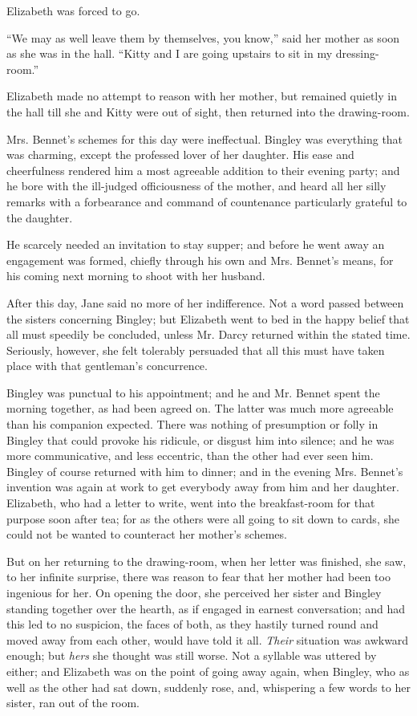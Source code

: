 \documentclass[12pt,openright]{book}
\begin{document}
Elizabeth was forced to go.

“We may as well leave them by themselves, you know,” said her mother as soon as she was in the hall. “Kitty and I are going upstairs to sit in my dressing-room.”

Elizabeth made no attempt to reason with her mother, but remained quietly in the hall till she and Kitty were out of sight, then returned into the drawing-room.

Mrs. Bennet’s schemes for this day were ineffectual. Bingley was everything that was charming, except the professed lover of her daughter. His ease and cheerfulness rendered him a most agreeable addition to their evening party; and he bore with the ill-judged officiousness of the mother, and heard all her silly remarks with a forbearance and command of countenance particularly grateful to the daughter.

He scarcely needed an invitation to stay supper; and before he went away an engagement was formed, chiefly through his own and Mrs. Bennet’s means, for his coming next morning to shoot with her husband.

After this day, Jane said no more of her indifference. Not a word passed between the sisters concerning Bingley; but Elizabeth went to bed in the happy belief that all must speedily be concluded, unless Mr. Darcy returned within the stated time. Seriously, however, she felt tolerably persuaded that all this must have taken place with that gentleman’s concurrence.

Bingley was punctual to his appointment; and he and Mr. Bennet spent the morning together, as had been agreed on. The latter was much more agreeable than his companion expected. There was nothing of presumption or folly in Bingley that could provoke his ridicule, or disgust him into silence; and he was more communicative, and less eccentric, than the other had ever seen him. Bingley of course returned with him to dinner; and in the evening Mrs. Bennet’s invention was again at work to get everybody away from him and her daughter. Elizabeth, who had a letter to write, went into the breakfast-room for that purpose soon after tea; for as the others were all going to sit down to cards, she could not be wanted to counteract her mother’s schemes.

But on her returning to the drawing-room, when her letter was finished, she saw, to her infinite surprise, there was reason to fear that her mother had been too ingenious for her. On opening the door, she perceived her sister and Bingley standing together over the hearth, as if engaged in earnest conversation; and had this led to no suspicion, the faces of both, as they hastily turned round and moved away from each other, would have told it all. \textit{Their} situation was awkward enough; but \textit{hers} she thought was still worse. Not a syllable was uttered by either; and Elizabeth was on the point of going away again, when Bingley, who as well as the other had sat down, suddenly rose, and, whispering a few words to her sister, ran out of the room.
\end{document}
